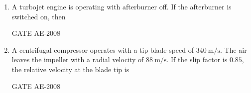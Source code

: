 \documentclass[journal,12pt,onecolumn]{IEEEtran}
\theoremstyle{remark}
\begin{document}
\begin{enumerate}
    \quad

\item A turbojet engine is operating with afterburner off. If the afterburner is switched on, then  \\
\begin{enumerate}
\end{enumerate}
 \hfill{GATE AE-2008}

    \quad

\item A centrifugal compressor operates with a tip blade speed of $340 \ \mathrm{m/s}$. The air leaves the impeller with a radial velocity of $88 \ \mathrm{m/s}$. If the slip factor is $0.85$, the relative velocity at the blade tip is  \\
\begin{enumerate}
\end{enumerate}
 \hfill{GATE AE-2008}

    \quad


\end{enumerate}
\end{document}
